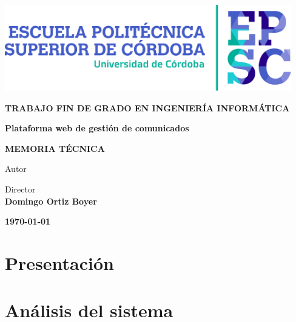 \documentclass[a4paper,12pt,twoside,final]{scrbook}
\begin{document}
\begin{center}
\fontfamily{\sfdefault}\selectfont
\vspace*{2cm}

\vfill
\vfill
\includegraphics[width=12.5cm]{LogotipoEPSC.pdf}
\vfill
\vfill

\large\textbf{\color{epsc:medio}
  TRABAJO FIN DE GRADO EN INGENIERÍA INFORMÁTICA
}
\vfill

\Huge\textbf{\color{epsc:oscuro}
  Plataforma web de gestión de comunicados
}
\vfill
\vfill

\Large\textbf{\color{epsc:verde}
  MEMORIA TÉCNICA
}
\vfill
\vfill

\large{\color{epsc:oscuro}Autor}\\
\textbf{\color{epsc:medio}{ Eduardo Arroyo Ramírez }}
\vfill

\large{\color{epsc:oscuro} Director }\\
\textbf{\color{epsc:medio} Domingo Ortiz Boyer}
\vfill



\textbf{\color{epsc:verde} \monthyeardate\today}
\vfill
\vfill
\vspace{2.7cm}
\end{center}

\clearpage

\thispagestyle{empty}
\pagecolor{white}

\cleardoublepage
\frontmatter
\tableofcontents
\listoffigures
\listoftables

\cleardoublepage
\mainmatter
\part{Presentación}






\part{Análisis del sistema}



\end{document}
